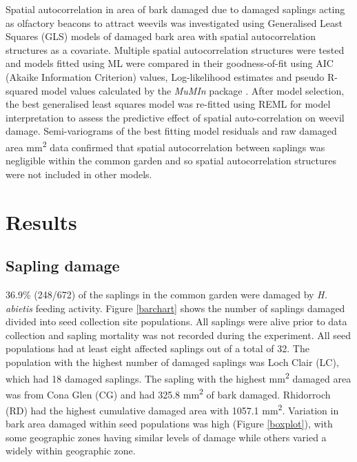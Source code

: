 \documentclass[a4paper, 11pt]{article}
\begin{document}
Spatial autocorrelation in area of bark damaged due to damaged saplings acting as olfactory beacons to attract weevils was investigated using Generalised Least Squares (GLS) models of damaged bark area with spatial autocorrelation structures as a covariate. Multiple spatial autocorrelation structures were tested and models fitted using ML were compared in their goodness-of-fit using AIC (Akaike Information Criterion) values, Log-likelihood estimates and pseudo R-squared model values calculated by the \textit{MuMIn} package \citep{MuMIn}. After model selection, the best generalised least squares model was re-fitted using REML for model interpretation to assess the predictive effect of spatial auto-correlation on weevil damage. Semi-variograms of the best fitting model residuals and raw damaged area mm\textsuperscript{2} data confirmed that spatial autocorrelation between saplings was negligible within the common garden and so spatial autocorrelation structures were not included in other models.

\section*{Results}

\subsection*{Sapling damage}

36.9\% (248/672) of the saplings in the common garden were damaged by \textit{H. abietis} feeding activity. Figure \ref{barchart} shows the number of saplings damaged divided into seed collection site populations. All saplings were alive prior to data collection and sapling mortality was not recorded during the experiment. All seed populations had at least eight affected saplings out of a total of 32. The population with the highest number of damaged saplings was Loch Clair (LC), which had 18 damaged saplings. The sapling with the highest mm\textsuperscript{2} damaged area was from Cona Glen (CG) and had 325.8 mm\textsuperscript{2} of bark damaged. Rhidorroch (RD) had the highest cumulative damaged area with 1057.1 mm\textsuperscript{2}. Variation in bark area damaged within seed populations was high (Figure \ref{boxplot}), with some geographic zones having similar levels of damage while others varied a widely within geographic zone.
\end{document}

